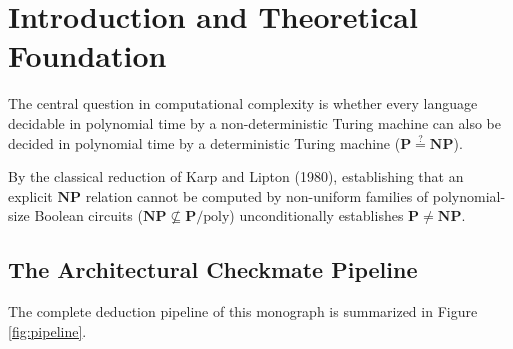 \documentclass[11pt,a4paper]{article}
\theoremstyle{plain}
\theoremstyle{definition}
\theoremstyle{remark}
\begin{document}
\begin{abstract}
All underlying combinatorial and algebraic invariants are verified using pure native Zig 0.16.0 kernels running with zero dynamic heap allocations and 256-bit AVX2 SIMD acceleration.
\end{abstract}

\tableofcontents
\newpage

\section{Introduction and Theoretical Foundation}

The central question in computational complexity is whether every language decidable in polynomial time by a non-deterministic Turing machine can also be decided in polynomial time by a deterministic Turing machine ($\mathbf{P} \stackrel{?}{=} \mathbf{NP}$).

By the classical reduction of Karp and Lipton (1980), establishing that an explicit $\mathbf{NP}$ relation cannot be computed by non-uniform families of polynomial-size Boolean circuits ($\mathbf{NP} \not\subseteq \mathbf{P}/\mathrm{poly}$) unconditionally establishes $\mathbf{P} \neq \mathbf{NP}$.

\subsection{The Architectural Checkmate Pipeline}

The complete deduction pipeline of this monograph is summarized in Figure \ref{fig:pipeline}.
\end{document}
